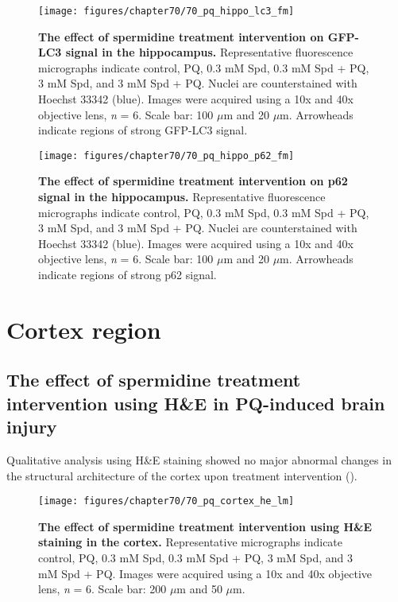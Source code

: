 \begin{landscape}
\begin{figure}[!htbp]
\center
  \texttt{[image: figures/chapter70/70\_pq\_hippo\_lc3\_fm]}
  \caption[The effect of spermidine treatment intervention on GFP-LC3 signal in the hippocampus]{\textbf{The effect of spermidine treatment  intervention on GFP-LC3 signal in the hippocampus.} Representative fluorescence micrographs indicate control, PQ, 0.3 mM Spd, 0.3 mM Spd + PQ, 3 mM Spd, and 3 mM Spd + PQ. Nuclei are counterstained with Hoechst 33342 (blue). Images were acquired using a 10x and 40x objective lens, \textit{n} = 6. Scale bar: 100 $\mu$m and 20 $\mu$m. Arrowheads indicate regions of strong GFP-LC3 signal.}
  \label{fig:70_pq_hippo_lc3_fm}
\end{figure} 
\end{landscape}

\begin{landscape}
\begin{figure}[!htbp]
\center
  \texttt{[image: figures/chapter70/70\_pq\_hippo\_p62\_fm]}
  \caption[The effect of spermidine treatment intervention on p62 signal in the hippocampus]{\textbf{The effect of spermidine treatment intervention on p62 signal in the hippocampus.} Representative fluorescence micrographs indicate control, PQ, 0.3 mM Spd, 0.3 mM Spd + PQ, 3 mM Spd, and 3 mM Spd + PQ. Nuclei are counterstained with Hoechst 33342 (blue). Images were acquired using a 10x and 40x objective lens, \textit{n} = 6. Scale bar: 100 $\mu$m and 20 $\mu$m. Arrowheads indicate regions of strong p62 signal.}
  \label{fig:70_pq_hippo_p62_fm}
\end{figure} 
\end{landscape}

\section{Cortex region}
\subsection{The effect of spermidine treatment intervention using H\&E in PQ-induced brain injury}
Qualitative analysis using H\&E staining showed no major abnormal changes in the structural architecture of the cortex upon treatment intervention ().

\begin{figure}[!htbp]
\center
  \texttt{[image: figures/chapter70/70\_pq\_cortex\_he\_lm]}
  \caption[The effect of spermidine treatment intervention using H\&E staining in the cortex]{\textbf{The effect of spermidine treatment intervention using H\&E staining in the cortex.} Representative micrographs indicate control, PQ, 0.3 mM Spd, 0.3 mM Spd + PQ, 3 mM Spd, and 3 mM Spd + PQ. Images were acquired using a 10x and 40x objective lens, \textit{n} = 6. Scale bar: 200 $\mu$m and 50 $\mu$m.}
  \label{fig:70_pq_cortex_he_lm}
\end{figure} 

